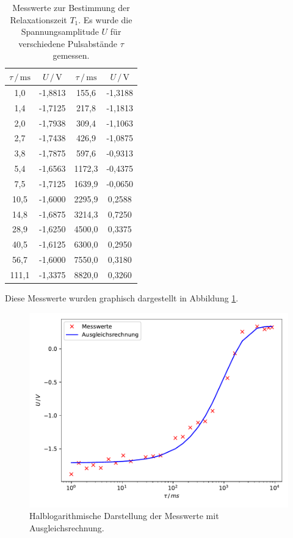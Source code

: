 \begin{table}
  \centering
  \caption{Messwerte zur Bestimmung der Relaxationszeit $T_1$. Es wurde die Spannungsamplitude $U$ für verschiedene Pulsabstände $\tau$ gemessen.}
  \label{tab:mess1}
  \begin{tabular}{c c c c}
  \toprule
  $\tau \,/\, \si{\milli\second}$ & $U \,/\, \si{\volt}$ & $\tau \,/\, \si{\milli\second}$
  & $U \,/\, \si{\volt}$\\
  \midrule 
        1,0 & -1,8813 &  155,6 & -1,3188\\
        1,4 & -1,7125 &  217,8 & -1,1813\\
        2,0 & -1,7938 &  309,4 & -1,1063\\
        2,7 & -1,7438 &  426,9 & -1,0875\\
        3,8 & -1,7875 &  597,6 & -0,9313\\
        5,4 & -1,6563 & 1172,3 & -0,4375\\
        7,5 & -1,7125 & 1639,9 & -0,0650\\
       10,5 & -1,6000 & 2295,9 &  0,2588\\
       14,8 & -1,6875 & 3214,3 &  0,7250\\
       28,9 & -1,6250 & 4500,0 &  0,3375\\
       40,5 & -1,6125 & 6300,0 &  0,2950\\
       56,7 & -1,6000 & 7550,0 &  0,3180\\
      111,1 & -1,3375 & 8820,0 &  0,3260\\
  \bottomrule
  \end{tabular}
\end{table}

Diese Messwerte wurden graphisch dargestellt in Abbildung \ref{fig:plot1}. 

\begin{figure}
  \centering
  \includegraphics[scale=0.7]{content/plot1.pdf}
  \caption{Halblogarithmische Darstellung der Messwerte mit Ausgleichsrechnung.}
  \label{fig:plot1}
\end{figure}

